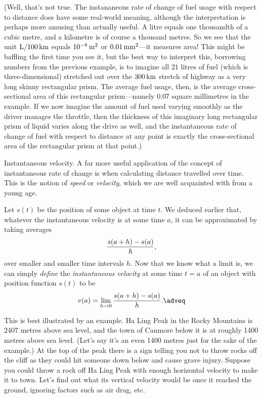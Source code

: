 (Well, that's not true. The instananeous rate of change of
fuel usage with respect to distance does have some real-world meaning, although the interpretation
is perhaps more amusing than actually useful.
A litre equals one thousandth of a cubic metre, and a kilometre is of course a thousand metres. So we
see that the unit $\hbox{L/100}\,\hbox{km}$ equals $10^{-8}\,\hbox{m}^2$ or $0.01\,\hbox{mm}^2$---it measures
area! This might be
baffling the first time you see it,
but the best way to interpret this, borrowing numbers from the previous
example, is to imagine all $21$ litres of fuel (which is three-dimensional)
stretched out over the $300\,\hbox{km}$ stretch of highway as a very long skinny rectangular prism. The
average fuel usage, then, is the average cross-sectional area of this rectangular prism---namely $0.07$
square millimetres in the example.  If we now
imagine the amount of fuel used varying smoothly as the driver manages the throttle, then the thickness
of this imaginary long rectangular prism of liquid varies along the drive as well, and
the instantaneous rate of change of fuel with respect to distance at any point is exactly the cross-sectional
area of the rectangular prism at that point.)

\medskip\boldlabel Instantaneous velocity.
A far more useful application of the concept of instantaneous rate of change is when calculating
distance travelled over time. This is the notion of {\it speed} or {\it velocity}, which we are well
acquainted with from a young age.

Let $s(t)$ be the position of some object at time $t$.
We deduced earlier that, whatever the instantaneous velocity is at some time $a$,
it can be approximated by taking averages
$${s(a+h) - s(a) \over h},$$
over smaller and smaller time intervals $h$. Now that we know what a limit is, we can simply {\it define}
the {\it instantaneous velocity} at some time $t=a$ of an object with position function $s(t)$ to be
\edef\eqvdef{\the\eqcount}
$$v(a) = \lim_{h\to 0} {s(a+h) - s(a) \over h}.\adveq$$

This is best illustrated by an example.
Ha Ling Peak in the Rocky Mountains is 2407 metres above sea level, and the town
of Canmore below it is at roughly 1400 metres above sea level. (Let's say it's an even 1400 metres just
for the sake of the example.)
At the top of the peak there is a sign
telling you not to throw rocks off the cliff as they could hit someone down below and cause grave injury.
Suppose you could throw a rock off Ha Ling Peak
with enough horizontal velocity to make it to town. Let's find out what its
vertical velocity would be once it reached the ground, ignoring factors such as air drag, etc.

